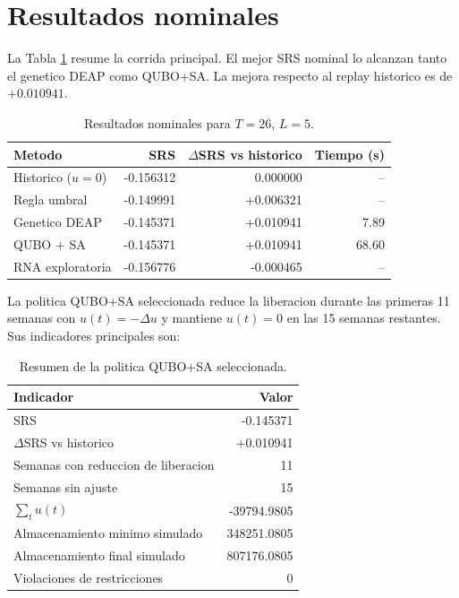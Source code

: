 \documentclass[11pt,letterpaper]{article}
\begin{document}
\section{Resultados nominales}

La Tabla \ref{tab:nominal} resume la corrida principal. El mejor SRS nominal
lo alcanzan tanto el genetico DEAP como QUBO+SA. La mejora respecto al replay
historico es de $+0.010941$.

\begin{table}[H]
\centering
\caption{Resultados nominales para $T=26$, $L=5$.}
\label{tab:nominal}
\begin{tabular}{lrrr}
\toprule
Metodo & SRS & $\Delta$SRS vs historico & Tiempo (s) \\
\midrule
Historico ($u=0$) & -0.156312 & 0.000000 & -- \\
Regla umbral & -0.149991 & +0.006321 & -- \\
Genetico DEAP & -0.145371 & +0.010941 & 7.89 \\
QUBO + SA & -0.145371 & +0.010941 & 68.60 \\
RNA exploratoria & -0.156776 & -0.000465 & -- \\
\bottomrule
\end{tabular}
\end{table}

La politica QUBO+SA seleccionada reduce la liberacion durante las primeras
11 semanas con $u(t)=-\Delta u$ y mantiene $u(t)=0$ en las 15 semanas
restantes. Sus indicadores principales son:

\begin{table}[H]
\centering
\caption{Resumen de la politica QUBO+SA seleccionada.}
\begin{tabular}{lr}
\toprule
Indicador & Valor \\
\midrule
SRS & -0.145371 \\
$\Delta$SRS vs historico & +0.010941 \\
Semanas con reduccion de liberacion & 11 \\
Semanas sin ajuste & 15 \\
$\sum_t u(t)$ & -39794.9805 \\
Almacenamiento minimo simulado & 348251.0805 \\
Almacenamiento final simulado & 807176.0805 \\
Violaciones de restricciones & 0 \\
\bottomrule
\end{tabular}
\end{table}
\end{document}
